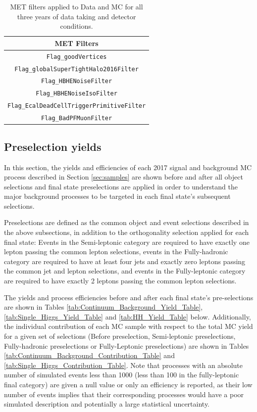 \begin{table}[H]
    \begin{center}
        \begin{tabular}{c}
        MET Filters \\ \hline
        {\tt Flag\_goodVertices} \\
        {\tt Flag\_globalSuperTightHalo2016Filter} \\
        {\tt Flag\_HBHENoiseFilter} \\
        {\tt Flag\_HBHENoiseIsoFilter} \\
        {\tt Flag\_EcalDeadCellTriggerPrimitiveFilter} \\
        {\tt Flag\_BadPFMuonFilter} \\ 
        \end{tabular}
    \end{center}
    \caption{
        MET filters applied to Data and MC for all three years of data taking and detector conditions. 
    }
    \label{tab:METfilters}
\end{table}

\subsection{Preselection yields} \label{sec:Preselection_yields}

In this section, the yields and efficiencies of each 2017 signal and background MC process described in Section \ref{sec:samples} are shown before and after all object selections and final state preselections are applied in order to understand the major background processes to be targeted in each final state's subsequent selections. 

Preselections are defined as the common object and event selections described in the above subsections, in addition to the orthogonality selection applied for each final state: 
Events in the Semi-leptonic category are required to have exactly one lepton passing the common lepton selections, events in the Fully-hadronic category are required to have at least four jets and exactly 
zero leptons passing the common jet and lepton selections, and events in the Fully-leptonic category are required to have exactly 2 leptons passing the common lepton selections. 

The yields and process efficiencies before and after each final state's pre-selections are shown in Tables \ref{tab:Continuum_Background_Yield_Table}, \ref{tab:Single_Higgs_Yield_Table} and \ref{tab:HH_Yield_Table} below. Additionally,
the individual contribution of each MC sample with respect to the total MC yield for a given set of selections (Before preselection, Semi-leptonic preselections, Fully-hadronic preselections or Fully-Leptonic preselections)
are shown in Tables \ref{tab:Continuum_Background_Contribution_Table} and \ref{tab:Single_Higgs_Contribution_Table}. Note that processes with an absolute number of simulated events less than 1000 (less than 100 in the fully-leptonic final category) are given a null value or only an efficiency is reported, as their low number of events implies that their corresponding processes would have a poor simulated description and potentially a large statistical uncertainty. 

